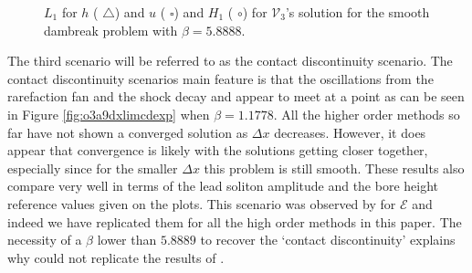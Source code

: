 \documentclass[SingleSpace,12pt,Journal]{Serre_ASCE}
\begin{document}
\begin{figure}
\centering
{}
\caption{$L_1$ for $h$ ({\color{red} $\triangle$}) and $u$ ({\color{blue} $\square$}) and $H_1$ ({\color{blue} $\circ$}) for $\mathcal{V}_3$'s solution for the smooth dambreak problem with $\beta = 5.8888$.}
\label{fig:o3a2dxlimmeasure}
\end{figure}

The third scenario will be referred to as the contact discontinuity \cite{El-etal-2006} scenario. The contact discontinuity scenarios main feature is that the oscillations from the rarefaction fan and the shock decay and appear to meet at a point as can be seen in Figure \ref{fig:o3a9dxlimcdexp} when $\beta = 1.1778$. All the higher order methods so far have not shown a converged solution as $\Delta x$ decreases. However, it does appear that convergence is likely with the solutions getting closer together, especially since for the smaller $\Delta x$ this problem is still smooth. These results also compare very well in terms of the lead soliton amplitude and the bore height reference values given on the plots. This scenario was observed by  for $\mathcal{E}$ and indeed we have replicated them for all the high order methods in this paper. The necessity of a $\beta$ lower than $5.8889$ to recover the `contact discontinuity' explains why \cite{Mitsotakis-etal-2014} could not replicate the results of \cite{El-etal-2006}. 
\end{document}
